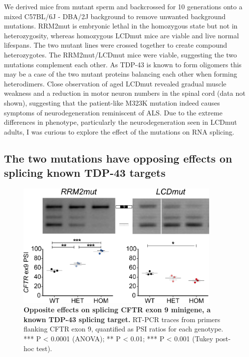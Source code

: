 We derived mice from mutant sperm and backcrossed for 10 generations onto a mixed C57BL/6J - DBA/2J background to remove unwanted background mutations.
RRM2mut is embryonic lethal in the homozygous state but not in heterozygosity, whereas homozygous LCDmut mice are viable and live normal lifespans. 
The two mutant lines were crossed together to create compound heterozygotes.
The RRM2mut/LCDmut mice were viable, suggesting the two mutations complement each other. As TDP-43 is known to form oligomers \citep{Afroz2017} this may be a case of the two mutant proteins balancing each other when forming heterodimers.
Close observation of aged LCDmut revealed gradual muscle weakness and a reduction in motor neuron numbers in the spinal cord (data not shown), suggesting that the patient-like M323K mutation indeed causes symptoms of neurodegeneration reminiscent of ALS. 
Due to the extreme differences in phenotype, particularly the neurodegeneration seen in LCDmut adults, I was curious to explore the effect of the mutations on RNA splicing.

\subsection{The two mutations have opposing effects on splicing known TDP-43 targets}

\begin{figure}[h!]
	\centering
	\includegraphics[width=10cm]{Figures/05_tdp_mice/CFTR.png}
	\caption[Opposite effects on splicing CFTR exon 9 minigene]{
		\textbf{Opposite effects on splicing CFTR exon 9 minigene, a known TDP-43 splicing target.}
	RT-PCR traces from primers flanking CFTR exon 9, quantified as PSI ratios for each genotype. *** P < 0.0001 (ANOVA); ** P < 0.01; *** P < 0.001 (Tukey post-hoc test).
	}	
	\label{fig:CFTR}
\end{figure}

